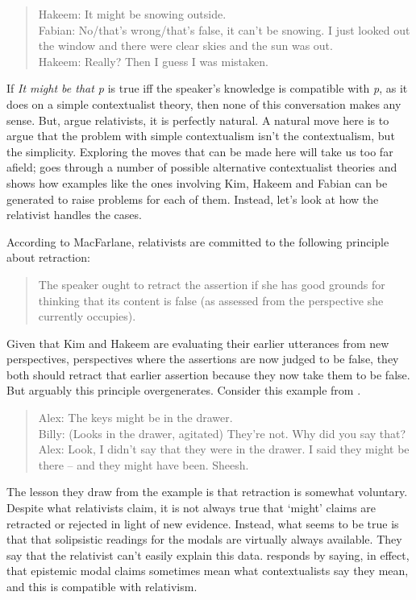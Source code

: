 \begin{quote}

Hakeem: It might be snowing outside.\\
Fabian: No\slash  that’s wrong\slash  that’s false, it can’t be snowing. I just looked out the window and there were clear skies and the sun was out.\\
Hakeem: Really? Then I guess I was mistaken. 
\end{quote}
If \emph{It might be that p} is true iff the speaker's knowledge is compatible with \emph{p}, as it does on a simple contextualist theory, then none of this conversation makes any sense. But, argue relativists, it is perfectly natural. A natural move here is to argue that the problem with simple contextualism isn't the contextualism, but the simplicity. Exploring the moves that can be made here will take us too far afield;  \citet{MacFarlane2014} goes through a number of possible alternative contextualist theories and shows how examples like the ones involving Kim, Hakeem and Fabian can be generated to raise problems for each of them. Instead, let's look at how the relativist handles the cases.

According to MacFarlane, relativists are committed to the following principle about retraction:

\begin{quote}

The speaker ought to retract the assertion if she has good grounds for thinking that its content is false (as assessed from the perspective she currently occupies). 
\end{quote}
Given that Kim and Hakeem are evaluating their earlier utterances from new perspectives, perspectives where the assertions are now judged to be false, they both should retract that earlier assertion because they now take them to be false. But arguably this principle overgenerates. Consider this example from  \citet{vonFintelGillies2008}.

\begin{quote}

Alex: The keys might be in the drawer.\\
Billy: (Looks in the drawer, agitated) They’re not. Why did you say that?\\
Alex: Look, I didn’t say that they were in the drawer. I said they might be there – and they might have been. Sheesh. ~\citep[81]{vonFintelGillies2008}
\end{quote}
The lesson they draw from the example is that retraction is somewhat voluntary. Despite what relativists claim, it is not always true that `might' claims are retracted or rejected in light of new evidence. Instead, what seems to be true is that that solipsistic readings for the modals are virtually always available. They say that the relativist can't easily explain this data.  \citet[Ch. 10]{MacFarlane2014} responds by saying, in effect, that epistemic modal claims sometimes mean what contextualists say they mean, and this is compatible with relativism.

